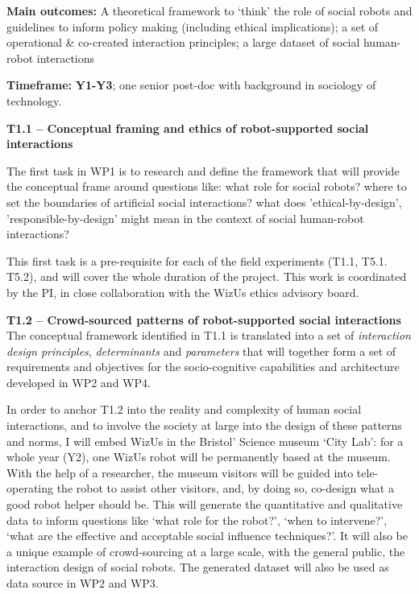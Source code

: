 \documentclass[11pt,a4paper]{report}
\newcommand{\project}{WizUs\xspace}
\begin{document}
\begin{framed}
    \textbf{Main outcomes:} A theoretical framework to `think' the role of
    social robots and guidelines to inform policy making (including ethical
    implications); a set of operational \& co-created interaction principles; a
    large dataset of social human-robot interactions

    \textbf{Timeframe:} \textbf{Y1-Y3}; one senior post-doc
with background in sociology of technology.
\end{framed}


\textbf{T1.1 -- Conceptual framing and ethics of robot-supported social
interactions}


The first task in WP1 is to research and define the framework that will provide
the conceptual frame around questions like: what role for
social robots? where to set the boundaries of artificial social interactions?
what does 'ethical-by-design', 'responsible-by-design' might mean in the context
of social human-robot interactions? 


This first task is a pre-requisite for each of the field experiments (T1.1,
T5.1. T5.2), and will cover the whole duration of the project. This work is
coordinated by the PI, in close collaboration with the \project ethics advisory
board.


\textbf{T1.2 -- Crowd-sourced patterns of robot-supported social
interactions} The conceptual framework identified in T1.1 is translated
into a set of \emph{interaction design principles}, \emph{determinants} and
\emph{parameters} that will together form a set of requirements and objectives
for the socio-cognitive capabilities and architecture developed in WP2 and WP4.

In order to anchor T1.2 into the reality and complexity of human social
interactions, and to involve the society at large into the design of these
patterns and norms, I will embed \project in the Bristol' Science museum `City
Lab': for a whole year (Y2), one \project robot will be permanently based at the
museum. With the help of a researcher, the museum visitors will be guided into
tele-operating the robot to assist other visitors, and, by doing so, co-design
what a good robot helper should be. This will generate the quantitative and
qualitative data to inform questions like `what role for the robot?', `when to
intervene?', `what are the effective and acceptable social influence
techniques?'. It will also be a unique example of crowd-sourcing at a large
scale, with the general public, the interaction design of social robots.  The
generated dataset will also be used as data source in WP2 and WP3.
\end{document}

